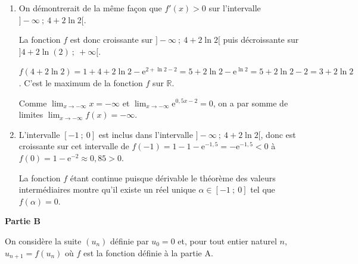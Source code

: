 \documentclass[10pt]{article}
\providecommand{\R}{\mathbb{R}}
\begin{document}
\begin{enumerate}
\begin{enumerate}
$f'(x) = 1 - 0,5\text{e}^{0,5x - 2}$.
		\item 
On a dans $\R$,

$f'(x) < 0 \iff 1 - 0,5\text{e}^{0,5x - 2} < 0 \iff 1 < 0,5\text{e}^{0,5x - 2} \iff 2 < \text{e}^{0,5x - 2}$. par croissance sur $\R_{+}^*$ de la fonction logarithme népérien $ \ln 2 < 0,5x - 2 \iff 2 + \ln 2 < 0,5x \iff 4 + 2\ln 2 < x$.

Conclusion : $S = ]4 + 2\ln (2)~;~+\infty[$

	\end{enumerate}
\item 
On démontrerait de la même façon que $f'(x) > 0$ sur l'intervalle $]- \infty~;~4 + 2\ln 2[$.

La fonction $f$ est donc croissante sur $]- \infty~;~4 + 2\ln 2[$ puis décroissante sur $]4 + 2\ln (2)~;~+\infty[$.

$f\left(4 + 2\ln 2 \right) = 1 + 4 + 2\ln 2 - \text{e}^{2 + \ln 2 - 2} = 5 + 2\ln 2 - \text{e}^{\ln 2} = 5 + 2\ln 2 - 2 = 3 + 2\ln 2$. C'est le maximum de la fonction $f$ sur $\R$.

Comme $\displaystyle\lim_{x \to - \infty} x = - \infty$ et $\displaystyle\lim_{x \to - \infty} \text{e}^{0,5x - 2} = 0$, on a par somme de limites  $\displaystyle\lim_{x \to - \infty} f(x) = - \infty$.
\item 
L'intervalle $[-1~;~0]$ est inclus dans l'intervalle $]- \infty~;~4 + 2\ln 2[$, donc est croissante sur cet intervalle de $f(-1) = 1 - 1 - \text{e}^{-1,5} = - \text{e}^{-1,5} < 0$ à $f(0) = 1 - \text{e}^{-2} \approx 0,85 > 0$.

La fonction $f$ étant continue puisque dérivable le théorème des valeurs intermédiaires montre qu'il existe un réel unique $\alpha \in[-1~;~0]$ tel que $f(\alpha) = 0$.
\end{enumerate}

\bigskip

\textbf{Partie B}

\medskip

On considère la suite $\left(u_n\right)$ définie par $u_0 = 0$ et, pour tout entier naturel $n$,
\: $u_{n+1} = f\left(u_n\right)$ où $f$ est la fonction définie à la partie A.

\medskip
\end{document}

